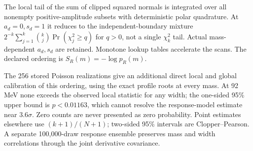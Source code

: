The local tail of the sum of clipped squared normals is integrated over all nonempty positive-amplitude subsets with deterministic polar quadrature. At $a_d=0,s_d=1$ it reduces to the independent-boundary mixture $2^{-k}\sum_{j=1}^{k}\binom{k}{j}\Pr(\chi_j^2\geq q)$ for $q>0$, not a single $\chi_k^2$ tail. Actual mass-dependent $a_d,s_d$ are retained. Monotone lookup tables accelerate the scans. The declared ordering is $S_R(m)=-\log p_R(m)$.

The 256 stored Poisson realizations give an additional direct local and global calibration of this ordering, using the exact profile roots at every mass. At 92 MeV none exceeds the observed local statistic for any width; the one-sided 95\% upper bound is $p<0.01163$, which cannot resolve the response-model estimate near $3.6\sigma$. Zero counts are never presented as zero probability. Point estimates elsewhere use $(k+1)/(N+1)$; two-sided 95\% intervals are Clopper--Pearson. A separate 100,000-draw response ensemble preserves mass and width correlations through the joint derivative covariance.
